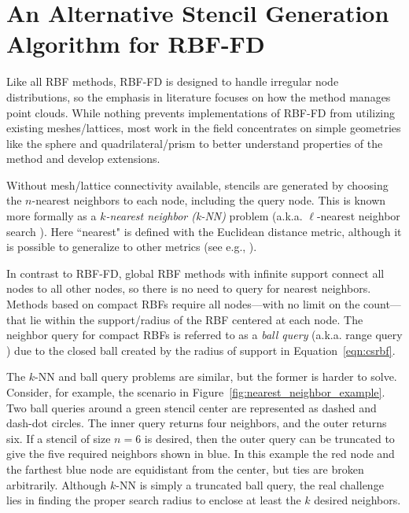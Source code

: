 \documentclass{report}
\begin{document}
\fi




\chapter{An Alternative Stencil Generation Algorithm for RBF-FD}
\label{chap:stencils}

Like all RBF methods, RBF-FD is designed to handle irregular node distributions, so the emphasis in literature focuses on how the method manages point clouds. While nothing prevents implementations of RBF-FD from utilizing existing meshes/lattices, most work in the field concentrates on simple geometries like the sphere \cite{FlyerWright07,FlyerLehto10,FlyerLehto11,FlyerWright09} and quadrilateral/prism \cite{FiNDTHESE} to better understand properties of the method and develop extensions. 


Without mesh/lattice connectivity available, stencils are generated by choosing the $n$-nearest neighbors to each node, including the query node. This is known more formally as a \emph{$k$-nearest neighbor (k-NN)} problem \cite{TagliasacchiMFE} (a.k.a. $\ell$-nearest neighbor search \cite{WendlandBook}). Here ``nearest" is defined with the Euclidean distance metric, although it is possible to generalize to other metrics (see e.g., \cite{MatlabKDTreeSearcher}). 

In contrast to RBF-FD, global RBF methods with infinite support connect all nodes to all other nodes, so there is no need to query for nearest neighbors. Methods based on compact RBFs require all nodes---with no limit on the count---that lie within the support/radius of the RBF centered at each node. The neighbor query for compact RBFs is referred to as a \emph{ball query} (a.k.a. range query \cite{WendlandBook}) due to the closed ball created by the radius of support in Equation~\ref{eqn:csrbf}. 

The $k$-NN and ball query problems are similar, but the former is harder to solve. Consider, for example, the scenario in Figure~\ref{fig:nearest_neighbor_example}. Two ball queries around a green stencil center are represented as dashed and dash-dot circles. The inner query returns four neighbors, and the outer returns six. If a stencil of size $n=6$ is desired, then the outer query can be truncated to give the five required neighbors shown in blue. In this example the red node and the farthest blue node are equidistant from the center, but ties are broken arbitrarily. Although $k$-NN is simply a truncated ball query, the real challenge lies in finding the proper search radius to enclose at least the $k$ desired neighbors.  
\end{document}
